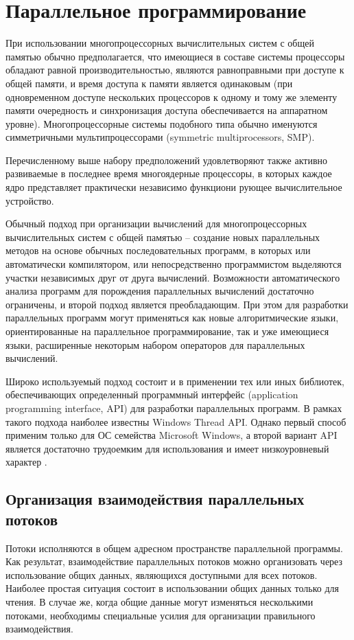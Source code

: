 \documentclass[12pt]{report}
\begin{document}
\section{Параллельное программирование}
	
При использовании многопроцессорных вычислительных систем с общей памятью обычно предполагается, что имеющиеся в составе системы процессоры обладают равной производительностью, являются равноправными при доступе к общей памяти, и время доступа к памяти является одинаковым (при одновременном доступе нескольких процессоров к одному и тому же элементу памяти очередность и синхронизация доступа обеспечивается на аппаратном уровне). Многопроцессорные системы подобного типа обычно именуются симметричными мультипроцессорами (symmetric multiprocessors, SMP).

Перечисленному выше набору предположений удовлетворяют также активно развиваемые в последнее время многоядерные процессоры, в которых каждое ядро представляет практически независимо функциони рующее вычислительное устройство.

Обычный подход при организации вычислений для многопроцессорных вычислительных систем с общей памятью – создание новых параллельных методов на основе обычных последовательных программ, в которых или автоматически компилятором, или непосредственно программистом выделяются участки независимых друг от друга вычислений. Возможности автоматического анализа программ для порождения параллельных вычислений достаточно ограничены, и второй подход является преобладающим. При этом для разработки параллельных программ могут применяться как новые алгоритмические языки, ориентированные на параллельное программирование, так и уже имеющиеся языки, расширенные некоторым набором операторов для параллельных вычислений.

Широко используемый подход состоит и в применении тех или иных библиотек, обеспечивающих определенный программный интерфейс (application programming interface, API) для разработки параллельных программ. В рамках такого подхода наиболее известны Windows Thread API. Однако первый способ применим только для ОС семейства Microsoft Windows, а второй вариант API является достаточно трудоемким для использования и имеет низкоуровневый характер \cite{Barkalov}.

\subsection{Организация взаимодействия параллельных потоков}
Потоки исполняются в общем адресном пространстве параллельной программы. Как результат, взаимодействие параллельных потоков можно организовать через использование общих данных, являющихся доступными для всех потоков. Наиболее простая ситуация состоит в использовании общих данных только для чтения. В случае же, когда общие данные могут изменяться несколькими потоками, необходимы специальные усилия для организации правильного взаимодействия.
\end{document}
